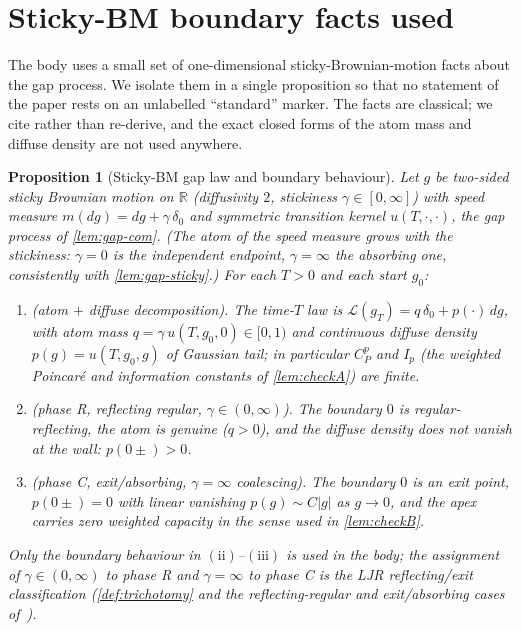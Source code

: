 \documentclass[reqno,final,11pt]{amsart}
\theoremstyle{plain}
\newtheorem{proposition}[theorem]{Proposition}
\theoremstyle{definition}
\theoremstyle{remark}
\newcommand{\R}{\mathbb R}
\begin{document}
\section{Sticky-BM boundary facts used}\label{app:stickyBM}

The body uses a small set of one-dimensional sticky-Brownian-motion facts about
the gap process. We isolate them in a single proposition so that no statement of
the paper rests on an unlabelled ``standard'' marker. The facts are classical;
we cite rather than re-derive, and the exact closed forms of the atom mass and
diffuse density are not used anywhere.

\begin{proposition}[Sticky-BM gap law and boundary behaviour]\label{prop:sticky-bm}
Let $g$ be two-sided sticky Brownian motion on $\R$ (diffusivity $2$, stickiness
$\gamma\in[0,\infty]$) with speed measure $m(dg)=dg+\gamma\,\delta_0$ and
symmetric transition kernel $u(T,\cdot,\cdot)$, the gap process of
\cref{lem:gap-com}. (The atom of the speed measure grows with the stickiness:
$\gamma=0$ is the independent endpoint, $\gamma=\infty$ the absorbing one,
consistently with \cref{lem:gap-sticky}.) For each $T>0$ and each start $g_0$:
\begin{enumerate}
\item[$(\mathrm i)$] (atom $+$ diffuse decomposition). The time-$T$ law is
$\mathcal L(g_T)=q\,\delta_0+p(\cdot)\,dg$, with atom mass
$q=\gamma\,u(T,g_0,0)\in[0,1)$ and continuous diffuse density $p(g)=u(T,g_0,g)$
of Gaussian tail; in particular $C^p_P$ and $I_p$ (the weighted Poincar\'e and
information constants of \cref{lem:checkA}) are finite.
\item[$(\mathrm{ii})$] (phase R, reflecting regular,
$\gamma\in(0,\infty)$). The boundary $0$ is regular-reflecting, the atom is
genuine ($q>0$), and the diffuse density does not vanish at the wall:
$p(0\pm)>0$.
\item[$(\mathrm{iii})$] (phase C, exit/absorbing, $\gamma=\infty$
coalescing). The boundary $0$ is an exit point, $p(0\pm)=0$ with linear vanishing
$p(g)\sim C|g|$ as $g\to0$, and the apex carries zero weighted capacity in the
sense used in \cref{lem:checkB}.
\end{enumerate}
Only the boundary behaviour in $(\mathrm{ii})$--$(\mathrm{iii})$ is used in the
body; the assignment of $\gamma\in(0,\infty)$ to phase R and $\gamma=\infty$ to
phase C is the LJR reflecting/exit classification (\cref{def:trichotomy} and the
reflecting-regular and exit/absorbing cases of~\citep{LJR-FCN}).
\end{proposition}
\end{document}

